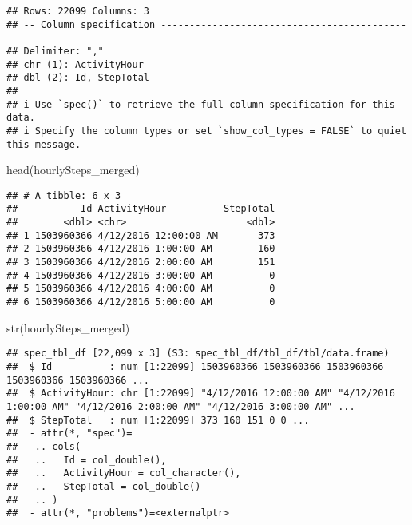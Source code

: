 \documentclass[
]{article}
\newenvironment{Shaded}{\begin{snugshade}}{\end{snugshade}}
\newcommand{\AttributeTok}[1]{\textcolor[rgb]{0.77,0.63,0.00}{#1}}
\newcommand{\FunctionTok}[1]{\textcolor[rgb]{0.00,0.00,0.00}{#1}}
\newcommand{\NormalTok}[1]{#1}
\newcommand{\OtherTok}[1]{\textcolor[rgb]{0.56,0.35,0.01}{#1}}
\newcommand{\SpecialCharTok}[1]{\textcolor[rgb]{0.00,0.00,0.00}{#1}}
\begin{document}
\begin{verbatim}
## Rows: 22099 Columns: 3
## -- Column specification --------------------------------------------------------
## Delimiter: ","
## chr (1): ActivityHour
## dbl (2): Id, StepTotal
## 
## i Use `spec()` to retrieve the full column specification for this data.
## i Specify the column types or set `show_col_types = FALSE` to quiet this message.
\end{verbatim}

\begin{Shaded}
\begin{Highlighting}[]
\FunctionTok{head}\NormalTok{(hourlySteps\_merged)}
\end{Highlighting}
\end{Shaded}

\begin{verbatim}
## # A tibble: 6 x 3
##           Id ActivityHour          StepTotal
##        <dbl> <chr>                     <dbl>
## 1 1503960366 4/12/2016 12:00:00 AM       373
## 2 1503960366 4/12/2016 1:00:00 AM        160
## 3 1503960366 4/12/2016 2:00:00 AM        151
## 4 1503960366 4/12/2016 3:00:00 AM          0
## 5 1503960366 4/12/2016 4:00:00 AM          0
## 6 1503960366 4/12/2016 5:00:00 AM          0
\end{verbatim}

\begin{Shaded}
\begin{Highlighting}[]
\FunctionTok{str}\NormalTok{(hourlySteps\_merged)}
\end{Highlighting}
\end{Shaded}

\begin{verbatim}
## spec_tbl_df [22,099 x 3] (S3: spec_tbl_df/tbl_df/tbl/data.frame)
##  $ Id          : num [1:22099] 1503960366 1503960366 1503960366 1503960366 1503960366 ...
##  $ ActivityHour: chr [1:22099] "4/12/2016 12:00:00 AM" "4/12/2016 1:00:00 AM" "4/12/2016 2:00:00 AM" "4/12/2016 3:00:00 AM" ...
##  $ StepTotal   : num [1:22099] 373 160 151 0 0 ...
##  - attr(*, "spec")=
##   .. cols(
##   ..   Id = col_double(),
##   ..   ActivityHour = col_character(),
##   ..   StepTotal = col_double()
##   .. )
##  - attr(*, "problems")=<externalptr>
\end{verbatim}

\begin{Shaded}
\end{Shaded}
\end{document}
